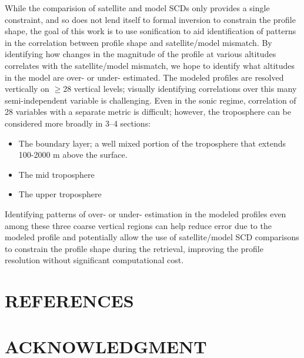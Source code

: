 \documentclass[a4paper,10pt,oneside]{article}
\begin{document}
\begin{sloppy}
While the comparision of satellite and model SCDs only provides a single constraint, and so does not lend itself to formal inversion to constrain the profile shape, the goal of this work is to use sonification to aid identification of patterns in the correlation between profile shape and satellite/model mismatch. By identifying how changes in the magnitude of the profile at various altitudes correlates with the satellite/model mismatch, we hope to identify what altitudes in the model are over- or under- estimated. The modeled profiles are resolved vertically on $\geq 28$ vertical levels; visually identifying correlations over this many semi-independent variable is challenging. Even in the sonic regime, correlation of 28 variables with a separate metric is difficult; however, the troposphere can be considered more broadly in 3--4 sections:
	\begin{itemize}
	\item The boundary layer; a well mixed portion of the troposphere that extends 100-2000 m above the surface.
	\item The mid troposphere
	\item The upper troposphere
	\end{itemize}
	Identifying patterns of over- or under- estimation in the modeled profiles even among these three coarse vertical regions can help reduce error due to the modeled profile and potentially allow the use of satellite/model SCD comparisons to constrain the profile shape during the retrieval, improving the profile resolution without significant computational cost.


\section{REFERENCES}
\label{sec:ref}


\section{ACKNOWLEDGMENT}
\label{sec:ack}



\end{sloppy}
\end{document}
